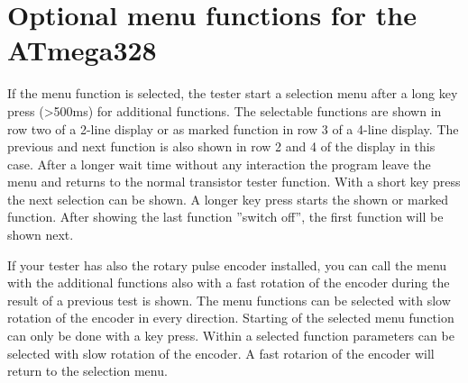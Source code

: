 \section{Optional menu functions for the ATmega328}
If the menu function is selected, the tester start a selection menu after a long key press (\textgreater 500ms)
for additional functions.
The selectable functions are shown in row two of a 2-line display or as marked function in row 3 of a 4-line display.
The previous and next function is also shown in row 2 and 4 of the display in this case.
After a longer wait time without any interaction the program leave the menu and returns to the normal transistor tester function.
With a short key press the next selection can be shown.
A longer key press starts the shown or marked function.
After showing the last function ''switch off'', the first function will be shown next.

If your tester has also the rotary pulse encoder installed, you can call the menu with the additional functions
also with a fast rotation of the encoder during the result of a previous test is shown.
The menu functions can be selected with slow rotation of the encoder in every direction.
Starting of the selected menu function can only be done with a key press.
Within a selected function parameters can be selected with slow rotation of the encoder.
A fast rotarion of the encoder will return to the selection menu.

